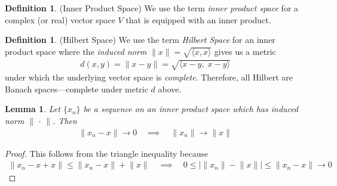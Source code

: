 \documentclass[12pt]{article}
\numberwithin{equation}{section} %
\theoremstyle{plain}
\newtheorem{lem}[thm]{Lemma}
\theoremstyle{definition}
\newtheorem{defn}[thm]{Definition}
\theoremstyle{remark}
\newcommand{\ra}{\rightarrow}
\begin{document}
\begin{defn}(Inner Product Space)
We use the term \emph{inner product space} for a complex (or real)
vector space $V$ that is equipped with an inner product.
\end{defn}

\begin{defn}(Hilbert Space)
We use the term \emph{Hilbert Space} for an inner product space where
the \emph{induced norm} $\lVert x\rVert=\sqrt{\langle x,x\rangle}$ gives
us a metric
\begin{align*}
  d(x,y) = \lVert x-y\rVert
  = \sqrt{\langle x-y,\; x-y\rangle}
\end{align*}
under which the underlying vector space is \emph{complete}.  Therefore,
all Hilbert are Banach spaces---complete under metric $d$ above.
\end{defn}

\begin{lem}
Let $\{x_n\}$ be a sequence on an inner product space which has induced
norm $\lVert\,\cdot\,\rVert$. Then
\begin{align*}
  \lVert x_n - x \rVert \ra 0
  \quad\implies\quad
  \lVert x_n \rVert \ra
  \lVert x \rVert
\end{align*}
\end{lem}
\begin{proof}
This follows from the triangle inequality because
\begin{align*}
  \lVert x_n - x + x\rVert
  \leq
  \lVert x_n - x\rVert + \lVert x\rVert
  \quad\implies\quad
  0 \leq
  \big\lvert
  \lVert x_n\rVert - \lVert x\rVert
  \big\rvert
  \leq
  \lVert x_n - x\rVert
  \ra 0
\end{align*}
\end{proof}
\end{document}

